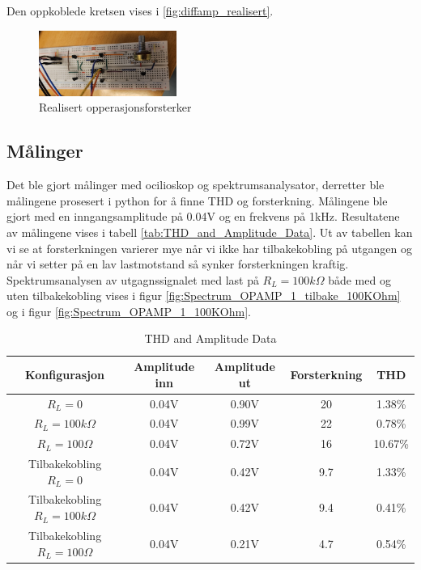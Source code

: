 Den oppkoblede kretsen vises i \autoref{fig:diffamp_realisert}.

\begin{figure}[!h]
    \centering
    \includegraphics[width=0.4\textwidth, angle=90]{Bilder/feilBilde.jpg}
    \caption{Realisert opperasjonsforsterker}
    \label{fig:diffamp_realisert}
\end{figure}

\clearpage
\subsection{Målinger}
Det ble gjort målinger med ocilioskop og spektrumsanalysator, derretter ble målingene prosesert i python for å finne THD og forsterkning. Målingene ble gjort med en inngangsamplitude på 0.04V og en frekvens på 1kHz. Resultatene av målingene vises i tabell \autoref{tab:THD_and_Amplitude_Data}. Ut av tabellen kan vi se at forsterkningen varierer mye når vi ikke har tilbakekobling på utgangen og når vi setter på en lav lastmotstand så synker forsterkningen kraftig. Spektrumsanalysen av utgagnssignalet med last på $R_L = 100k\Omega$ både med og uten tilbakekobling vises i figur \autoref{fig:Spectrum_OPAMP_1_tilbake_100KOhm} og i figur \autoref{fig:Spectrum_OPAMP_1_100KOhm}. 

\begin{table}[h!]
    \centering
    \begin{tabular}{ |c|c|c|c|c| }
        \hline
        Konfigurasjon & Amplitude inn & Amplitude ut & Forsterkning &THD\\
        \hline
        $R_L = 0$ & 0.04V & 0.90V & 20 &1.38\% \\
        $R_L = 100k\Omega$ & 0.04V & 0.99V & 22& 0.78\% \\
        $R_L = 100\Omega$ & 0.04V & 0.72V & 16& 10.67\% \\
        \hline
        Tilbakekobling $R_L =0$& 0.04V & 0.42V & 9.7& 1.33\% \\
        Tilbakekobling $R_L =100k\Omega$ & 0.04V & 0.42V & 9.4& 0.41\% \\
        Tilbakekobling $R_L =100\Omega$ & 0.04V & 0.21V & 4.7& 0.54\% \\
        \hline
    \end{tabular}
    \caption{THD and Amplitude Data}
    \label{tab:THD_and_Amplitude_Data}
  \end{table}

